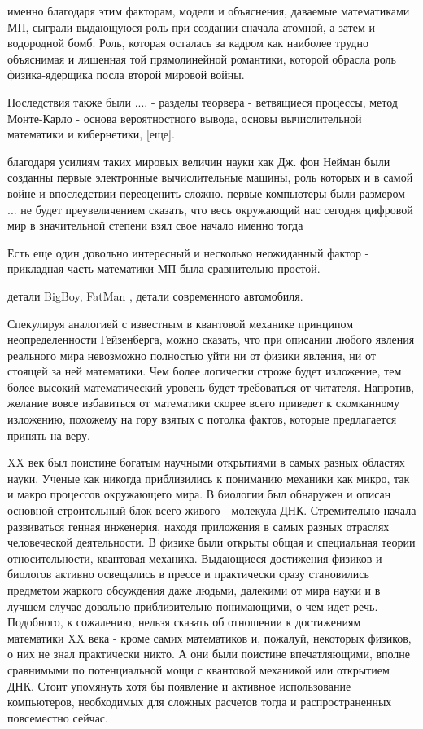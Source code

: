 именно благодаря этим факторам, модели и объяснения, даваемые математиками МП, сыграли выдающуюся роль при создании сначала атомной, а затем и водородной бомб. 
Роль, которая осталась за кадром как наиболее трудно объяснимая и лишенная той прямолинейной романтики, которой обрасла роль физика-ядерщика посла второй мировой войны.

Последствия также были .... - разделы теорвера - ветвящиеся процессы, метод Монте-Карло - основа вероятностного вывода, основы вычислительной математики и кибернетики, [еще].

благодаря усилиям таких мировых величин науки как Дж. фон Нейман были созданны первые электронные вычислительные машины, роль которых и в самой войне и впоследствии переоценить сложно.
первые компьютеры были размером ...
не будет преувеличением сказать, что весь окружающий нас сегодня цифровой мир в значительной степени взял свое начало именно тогда
  
Есть еще один довольно интересный и несколько неожиданный фактор - прикладная часть математики МП была сравнительно простой. 

детали BigBoy, FatMan , детали современного автомобиля.


Спекулируя аналогией с известным в квантовой механике принципом неопределенности Гейзенберга, можно сказать, что при описании любого явления реального мира невозможно полностью уйти ни от физики явления, ни от стоящей за ней математики.
Чем более логически строже будет изложение, тем более высокий математический уровень будет требоваться от читателя.
Напротив, желание вовсе избавиться от математики скорее всего приведет к скомканному изложению, похожему на гору взятых с потолка фактов, которые предлагается принять на веру.











XX век был поистине богатым научными открытиями в самых разных областях науки. Ученые как никогда приблизились к пониманию механики как микро, так и макро процессов окружающего мира. В биологии был обнаружен и описан основной строительный блок всего живого - молекула ДНК. Стремительно начала развиваться генная инженерия, находя приложения в самых разных отраслях человеческой деятельности. В физике были открыты общая и специальная теории относительности, квантовая механика. Выдающиеся достижения физиков и биологов активно освещались в прессе и практически сразу становились предметом жаркого обсуждения даже людьми, далекими от мира науки и в лучшем случае довольно приблизительно понимающими, о чем идет речь. 
Подобного, к сожалению, нельзя сказать об отношении к достижениям математики XX века - кроме самих математиков и, пожалуй, некоторых физиков, о них не знал практически никто. А они были поистине впечатляющими, вполне сравнимыми по потенциальной мощи с квантовой механикой или открытием ДНК. Стоит упомянуть хотя бы появление и активное использование компьютеров, необходимых для сложных расчетов тогда и распространенных повсеместно сейчас.

